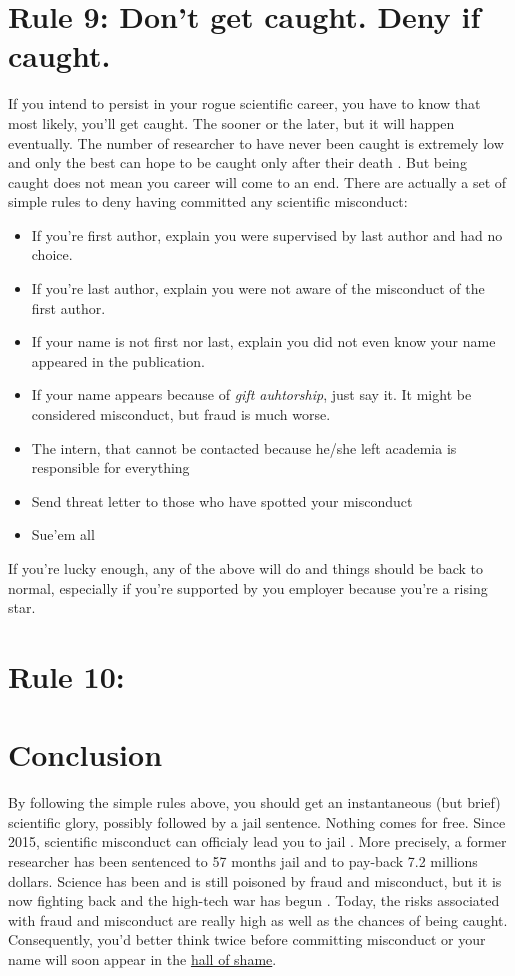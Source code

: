 \documentclass[a4paper,10pt,onecolumn]{article}
\begin{document}
\section*{Rule 9: Don't get caught. Deny if caught.}

If you intend to persist in your rogue scientific career, you have to know that
most likely, you'll get caught. The sooner or the later, but it will happen
eventually. The number of researcher to have never been caught is extremely low
and only the best can hope to be caught only after their death
\citep{degroote:2016,}. But being caught does not mean you career will come to
an end. There are actually a set of simple rules to deny having committed any
scientific misconduct:
\begin{itemize}
  \item If you're first author, explain you were supervised by last author and
    had no choice.
  \item If you're last author, explain you were not aware of the misconduct of
    the first author.
  \item If your name is not first nor last, explain you did not even know your
    name appeared in the publication.
  \item If your name appears because of {\em gift auhtorship}, just say it.
    It might be considered misconduct, but fraud is much worse.
  \item The intern, that cannot be contacted because he/she left academia is
    responsible for everything
  \item Send threat letter to those who have spotted your misconduct
  \item Sue'em all
\end{itemize}
If you're lucky enough, any of the above will do and things should be back to
normal, especially if you're supported by you employer because you're a rising
star.

\section*{Rule 10: }

\section*{Conclusion}

By following the simple rules above, you should get an instantaneous (but
brief) scientific glory, possibly followed by a jail sentence. Nothing comes
for free. Since 2015, scientific misconduct can officialy lead you to jail
\citep{grant:2015}. More precisely, a former researcher has been sentenced to
57 months jail and to pay-back 7.2 millions dollars. Science has been and is
still poisoned by fraud and misconduct, but it is now fighting back and the
high-tech war has begun \citep{buranyi:2017}. Today, the risks associated with
fraud and misconduct are really high as well as the chances of being
caught. Consequently, you'd better think twice before committing misconduct or
your name will soon appear in the
\href{https://en.wikipedia.org/wiki/Scientific_misconduct#Notable_individual_cases}{hall
  of shame}.

\renewcommand*{\bibfont}{\small}
\printbibliography[title=References]
\end{document}
